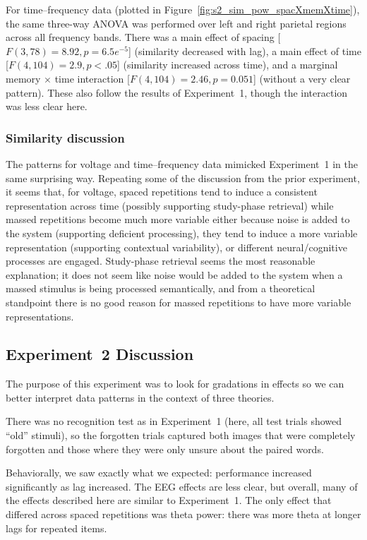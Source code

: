 For time--frequency data (plotted in Figure~\ref{fig:s2_sim_pow_spacXmemXtime}), the same three-way ANOVA was performed over left and right parietal regions across all frequency bands.
There was a main effect of spacing [$F(3,78)=8.92, p=6.5e^{-5}$] (similarity decreased with lag), a main effect of time [$F(4,104)=2.9, p<.05$] (similarity increased across time), and a marginal memory $\times$ time interaction [$F(4,104)=2.46, p=0.051$] (without a very clear pattern).  These also follow the results of Experiment~1, though the interaction was less clear here.

\subsubsection{Similarity discussion}

The patterns for voltage and time--frequency data mimicked Experiment~1 in the same surprising way.  Repeating some of the discussion from the prior experiment, it seems that, for voltage, spaced repetitions tend to induce a consistent representation across time (possibly supporting study-phase retrieval) while massed repetitions become much more variable either because noise is added to the system (supporting deficient processing), they tend to induce a more variable representation (supporting contextual variability), or different neural/cognitive processes are engaged.  Study-phase retrieval seems the most reasonable explanation; it does not seem like noise would be added to the system when a massed stimulus is being processed semantically, and from a theoretical standpoint there is no good reason for massed repetitions to have more variable representations.

\subsection{Experiment~2 Discussion}

The purpose of this experiment was to look for gradations in effects so we can better interpret data patterns in the context of three theories.

There was no recognition test as in Experiment~1 (here, all test trials showed ``old'' stimuli), so the forgotten trials captured both images that were completely forgotten and those where they were only unsure about the paired words.

Behaviorally, we saw exactly what we expected: performance increased significantly as lag increased.  The EEG effects are less clear, but overall, many of the effects described here are similar to Experiment~1.  The only effect that differed across spaced repetitions was theta power: there was more theta at longer lags for repeated items.


